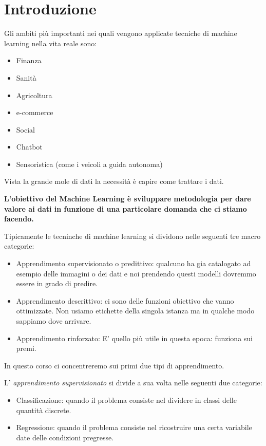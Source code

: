 \pagestyle{fancy}
\cfoot{\thepage}
\renewcommand{\footrulewidth}{0.25pt}


\section{Introduzione}
Gli ambiti più importanti nei quali vengono applicate tecniche di machine learning nella vita reale sono:
\begin{itemize}
	\item Finanza
	\item Sanità
	\item Agricoltura
	\item e-commerce
	\item Social
	\item Chatbot
	\item Sensoristica (come i veicoli a guida autonoma)
\end{itemize}

Vista la grande mole di dati la necessità è capire come trattare i dati.

\textbf{L'obiettivo del Machine Learning è sviluppare metodologia per dare valore ai dati in funzione di una particolare domanda che ci stiamo facendo.}

Tipicamente le tecninche di machine learning si dividono nelle seguenti tre macro categorie:
\begin{itemize}
	\item Apprendimento supervisionato o predittivo: qualcuno ha gia catalogato ad esempio delle immagini o dei dati e noi prendendo questi modelli dovremmo essere in grado di predire.
	\item Apprendimento descrittivo: ci sono delle funzioni obiettivo che vanno ottimizzate. Non usiamo etichette della singola istanza ma in qualche modo sappiamo dove arrivare.
	\item Apprendimento rinforzato: E' quello più utile in questa epoca: funziona sui premi.
\end{itemize}

In questo corso ci concentreremo sui primi due tipi di apprendimento.

L' \textit{apprendimento supervisionato} si divide a sua volta nelle seguenti due categorie:
\begin{itemize}
	\item Classificazione: quando il problema consiste nel dividere in classi delle quantità discrete.
	\item Regressione: quando il problema consiste nel ricostruire una certa variabile date delle condizioni pregresse.
\end{itemize}

